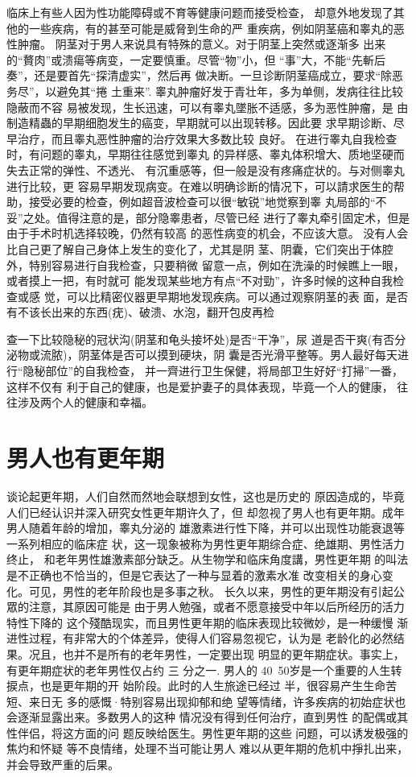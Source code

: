 \documentclass[12pt,UTF8]{ctexbook}
\begin{document}
临床上有些人因为性功能障碍或不育等健康问题而接受检查，
却意外地发现了其他的一些疾病，有的甚至可能是威脅到生命的严
重疾病，例如阴茎癌和睾丸的恶性肿瘤。
阴茎对于男人来说具有特殊的意义。对于阴茎上突然或逐渐多
出来的“贅肉”或溃瘍等病变，一定要慎重。尽管“物”小，但
“事”大，不能“先斬后奏”，还是要首先“探清虚实”，然后再
做决断。一旦诊断阴茎癌成立，要求“除恶务尽”，以避免其“捲
土重来”.
睾丸肿瘤好发于青壮年，多为单侧，发病往往比较隐蔽而不容
易被发现，生长迅速，可以有睾丸墜胀不适感，多为恶性肿瘤，是
由制造精蟲的早期细胞发生的癌变，早期就可以出现转移。因此要
求早期诊断、尽早治疗，而且睾丸恶性肿瘤的治疗效果大多数比较
良好。
在进行睾丸自我检查时，有问题的睾丸，早期往往感觉到睾丸
的异样感、睾丸体积增大、质地坚硬而失去正常的弹性、不透光、
有沉重感等，但一般是没有疼痛症状的。与对侧睾丸进行比较，更
容易早期发现病变。在难以明确诊断的情况下，可以請求医生的帮
助，接受必要的检查，例如超音波检查可以很“敏锐”地觉察到睾
丸局部的“不妥”之处。值得注意的是，部分隐睾患者，尽管已经
进行了睾丸牵引固定术，但是由于手术时机选择较晚，仍然有较高
的恶性病变的机会，不应该大意。
没有人会比自己更了解自己身体上发生的变化了，尤其是阴
茎、阴囊，它们突出于体腔外，特别容易进行自我检查，只要稍微
留意一点，例如在洗澡的时候瞧上一眼，或者摸上一把，有时就可
能发现某些地方有点“不对勁”，许多时候的这种自我检查或感
觉，可以比精密仪器更早期地发现疾病。可以通过观察阴茎的表
面，是否有不该长出来的东西(疣)、破溃、水泡，翻开包皮再检

查一下比较隐秘的冠状沟(阴茎和龟头接坏处)是否“干净”，尿
道是否干爽(有否分泌物或流脓)，阴茎体是否可以摸到硬块，阴
囊是否光滑平整等。男人最好每天进行“隐秘部位”的自我检查，
并一齊进行卫生保健，将局部卫生好好“打掃”一番，这样不仅有
利于自己的健康，也是爱护妻子的具体表现，毕竟一个人的健康，
往往涉及两个人的健康和幸福。

\section{男人也有更年期}
谈论起更年期，人们自然而然地会联想到女性，这也是历史的
原因造成的，毕竟人们已经认识并深入研究女性更年期许久了，但
却忽视了男人也有更年期。成年男人随着年龄的增加，睾丸分泌的
雄激素进行性下降，并可以出现性功能衰退等一系列相应的临床症
状，这一现象被称为男性更年期综合症、绝雄期、男性活力终止，
和老年男性雄激素部分缺乏。从生物学和临床角度講，男性更年期
的叫法是不正确也不恰当的，但是它表达了一种与显着的激素水准
改变相关的身心变化。可见，男性的老年阶段也是多事之秋。
长久以来，男性的更年期没有引起公眾的注意，其原因可能是
由于男人勉强，或者不愿意接受中年以后所经历的活力特性下降的
这个殘酷现实，而且男性更年期的临床表现比较微妙，是一种缓慢
渐进性过程，有非常大的个体差异，使得人们容易忽视它，认为是
老龄化的必然结果。况且，也并不是所有的老年男性，一定要出现
明显的更年期症状。事实上，有更年期症状的老年男性仅占约 三
分之一.
男人的 40~50岁是一个重要的人生转捩点，也是更年期的开
始阶段。此时的人生旅途已经过
半，很容易产生生命苦短、来日无
多的感慨·特别容易出现抑郁和绝
望等情绪，许多疾病的初始症状也
会逐渐显露出来。多数男人的这种
情况没有得到任何治疗，直到男性
的配偶或其性伴侣，将这方面的问
题反映给医生。男性更年期的这些
问题，可以诱发极强的焦灼和怀疑
等不良情绪，处理不当可能让男人
难以从更年期的危机中掙扎出来，
并会导致严重的后果。
\end{document}
